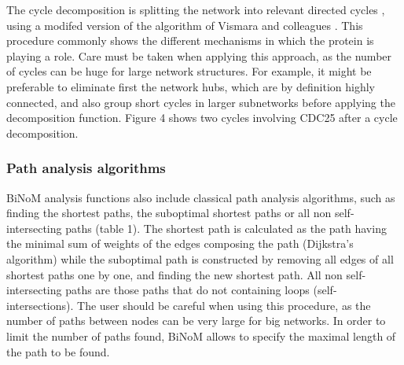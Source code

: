 \documentclass[10pt]{bmc_article}
\newenvironment{bmcformat}{\baselineskip20pt\sloppy\setboolean{publ}{false}}{\baselineskip20pt\sloppy}
\begin{document}
\begin{bmcformat}


The cycle decomposition is splitting the network into relevant directed cycles
\cite{gleiss2001relevant}, using a modifed version of the algorithm of Vismara
and colleagues \cite{vismara1997union}. This procedure commonly shows the
different mechanisms in which the protein is playing a role. Care must
be taken when applying this approach, as the number of cycles can be huge for
large network structures. For example, it might be preferable to eliminate first
the network hubs, which are by definition highly connected, and also group short
cycles in larger subnetworks before applying the decomposition function.
Figure 4 shows two
cycles involving CDC25 after a cycle decomposition.


\subsubsection*{Path analysis algorithms}

BiNoM analysis functions also include classical path analysis
algorithms, such as finding the shortest paths, the suboptimal shortest paths or
all non self-intersecting paths (table 1). The shortest path is calculated as the path having
the minimal sum of weights of the edges composing the path (Dijkstra's
algorithm) while the suboptimal path is constructed by removing all edges of
all shortest paths one by one, and finding the new shortest path. All non self-intersecting paths 
are those paths that do not containing loops (self-intersections). 
The user should be careful when using this procedure, as the number of paths between nodes can be
very large for big networks. In order to limit the number of paths found, BiNoM
allows to specify the maximal length of the path to be found.


\end{bmcformat}
\end{document}
